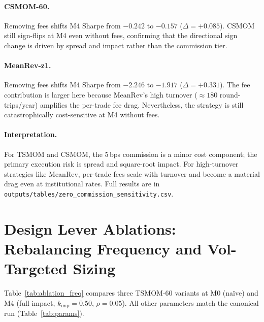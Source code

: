 \documentclass[12pt]{article}
\newcommand{\kimp}{k_{\mathrm{imp}}}
\begin{document}
\paragraph{CSMOM-60.}
Removing fees shifts M4 Sharpe from $-0.242$ to $-0.157$
($\Delta = +0.085$). CSMOM still sign-flips at M4 even without
fees, confirming that the directional sign change is driven by
spread and impact rather than the commission tier.

\paragraph{MeanRev-z1.}
Removing fees shifts M4 Sharpe from $-2.246$ to $-1.917$
($\Delta = +0.331$). The fee contribution is larger here because
MeanRev's high turnover ($\approx 180$ round-trips/year)
amplifies the per-trade fee drag. Nevertheless, the strategy is
still catastrophically cost-sensitive at M4 without fees.

\paragraph{Interpretation.}
For TSMOM and CSMOM, the 5\,bps commission is a minor cost
component; the primary execution risk is spread and square-root
impact. For high-turnover strategies like MeanRev, per-trade
fees scale with turnover and become a material drag even at
institutional rates. Full results are in
\texttt{outputs/tables/zero\_commission\_sensitivity.csv}.

\section{Design Lever Ablations: Rebalancing Frequency and Vol-Targeted Sizing}
\label{app:ablation_freq}

Table~\ref{tab:ablation_freq} compares three TSMOM-60 variants at M0
(na\"{i}ve) and M4 (full impact, $\kimp=0.50$, $\rho=0.05$).
All other parameters match the canonical run (Table~\ref{tab:params}).
\end{document}
